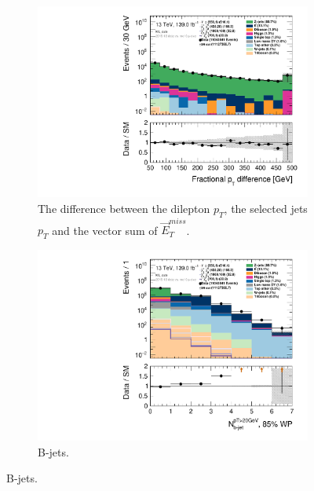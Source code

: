 \begin{figure}[H]
\begin{subfigure}[t!]{0.49\textwidth}
        \includegraphics[width=\textwidth]{Figures/ML_cuts/hist1d_pTdiff_ML_cuts.pdf}
    \caption{The difference between the dilepton $p_T$, the selected jets $p_T$ and the vector sum of $\Vec{E}_T^{miss}$.}
    \label{fig:my_label}
    \end{subfigure}
    \begin{subfigure}[t!]{0.49\textwidth}
        \includegraphics[width=\textwidth]{Figures/ML_cuts/hist1d_nBJet20_MV2c10_FixedCutBEff_85_ML_cuts.pdf}
    \caption{B-jets.}
    \label{fig:bjetMLcuts}
    \end{subfigure}
\end{figure}

